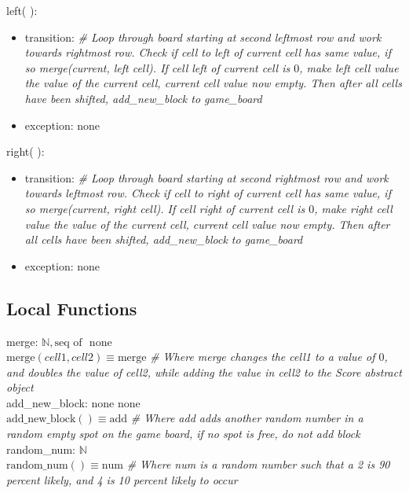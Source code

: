 \documentclass[12pt]{article}
\begin{document}
\noindent left( ):
\begin{itemize}
\item transition: \textit{\# Loop through board starting at second leftmost row and work towards rightmost row. Check if cell to left of current cell has same value, if so merge(current, left cell). If cell left of current cell is $0$, make left cell value the value of the current cell, current cell value now empty. Then after all cells have been shifted, add\_new\_block to game\_board} ~\\
\item exception: none
\end{itemize}

\noindent right( ):
\begin{itemize}
\item transition: \textit{\# Loop through board starting at second rightmost row and work towards leftmost row. Check if cell to right of current cell has same value, if so merge(current, right cell). If cell right of current cell is $0$, make right cell value the value of the current cell, current cell value now empty. Then after all cells have been shifted, add\_new\_block to game\_board} ~\\
\item exception: none
\end{itemize}

\subsection*{Local Functions}

\noindent merge:  $\mathbb{N}, \text{seq of } $ \rightarrow none \\
\noindent $\mbox{merge}(cell1, cell2) \equiv \text{merge} $
\textit{\# Where merge changes the cell1 to a value of $0$, and doubles the value of cell2, while adding the value in cell2 to the Score abstract object} ~\\

\noindent add\_new\_block: none \rightarrow none \\
\noindent $\mbox{add\_new\_block}() \equiv \text{add} $
\textit{\# Where add adds another random number in a random empty spot on the game board, if no spot is free, do not add block} ~\\

\noindent random\_num:  \rightarrow $\mathbb{N}$\\
\noindent $\mbox{random\_num}() \equiv \text{num} $
\textit{\# Where num is a random number such that a 2 is 90 percent likely, and 4 is 10 percent likely to occur} ~\\
\end{document}
